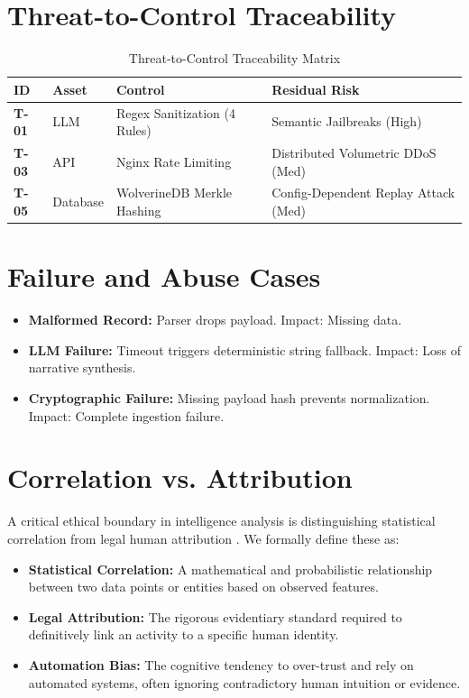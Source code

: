 \section{Threat-to-Control Traceability}
\label{sec:sec-threat-traceability}
\begin{table}[htpb]
\centering
\begin{tabular}{p{} p{} p{} p{}}
\toprule
\textbf{ID} & \textbf{Asset} & \textbf{Control} & \textbf{Residual Risk} \\
\midrule
\textbf{T-01} & LLM & Regex Sanitization (4 Rules) & Semantic Jailbreaks (High) \\
\textbf{T-03} & API & Nginx Rate Limiting & Distributed Volumetric DDoS (Med) \\
\textbf{T-05} & Database & WolverineDB Merkle Hashing & Config-Dependent Replay Attack (Med) \\
\bottomrule
\end{tabular}
\caption{Threat-to-Control Traceability Matrix}
\label{tab:threat-controls}
\end{table}

\section{Failure and Abuse Cases}
\label{sec:sec-failure-cases}
\begin{itemize}
    \item \textbf{Malformed Record:} Parser drops payload. Impact: Missing data.
    \item \textbf{LLM Failure:} Timeout triggers deterministic string fallback. Impact: Loss of narrative synthesis.
    \item \textbf{Cryptographic Failure:} Missing payload hash prevents normalization. Impact: Complete ingestion failure.
\end{itemize}

\section{Correlation vs. Attribution}
\label{sec:sec-correlation-attribution}
A critical ethical boundary in intelligence analysis is distinguishing statistical correlation from legal human 
attribution \cite{nist2012guide, dwork2006differential}. We formally define these as:
\begin{itemize}
    \item \textbf{Statistical Correlation:} A mathematical and probabilistic relationship between two data points or 
          entities based on observed features.
    \item \textbf{Legal Attribution:} The rigorous evidentiary standard required to definitively link an activity to 
          a specific human identity.
    \item \textbf{Automation Bias:} The cognitive tendency to over-trust and rely on automated systems, often ignoring 
          contradictory human intuition or evidence.
\end{itemize}

